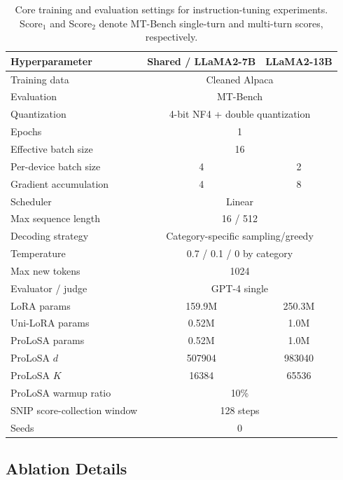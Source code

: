 \begin{table}[t]
\centering
\small
\renewcommand{\arraystretch}{0.9} %
\setlength{\tabcolsep}{4pt}
\begin{tabular}{lcc}
\toprule
Hyperparameter & Shared / LLaMA2-7B & LLaMA2-13B \\
\midrule
Training data & \multicolumn{2}{c}{Cleaned Alpaca} \\
Evaluation & \multicolumn{2}{c}{MT-Bench} \\
Quantization & \multicolumn{2}{c}{4-bit NF4 + double quantization} \\
Epochs & \multicolumn{2}{c}{1} \\
Effective batch size & \multicolumn{2}{c}{16} \\
Per-device batch size & 4 & 2 \\
Gradient accumulation & 4 & 8 \\
Scheduler & \multicolumn{2}{c}{Linear} \\
Max sequence length & \multicolumn{2}{c}{16 / 512} \\
Decoding strategy & \multicolumn{2}{c}{Category-specific sampling/greedy} \\
Temperature & \multicolumn{2}{c}{0.7 / 0.1 / 0 by category} \\
Max new tokens & \multicolumn{2}{c}{1024} \\
Evaluator / judge & \multicolumn{2}{c}{GPT-4 single} \\
LoRA params & 159.9M & 250.3M \\
Uni-LoRA params & 0.52M & 1.0M \\
ProLoSA params & 0.52M & 1.0M \\
ProLoSA $d$ & 507904 & 983040 \\
ProLoSA $K$ & 16384 & 65536 \\
ProLoSA warmup ratio & \multicolumn{2}{c}{10\%} \\
SNIP score-collection window & \multicolumn{2}{c}{128 steps}\\
Seeds & \multicolumn{2}{c}{0} \\
\bottomrule
\end{tabular}
\caption{Core training and evaluation settings for instruction-tuning experiments. Score$_1$ and Score$_2$ denote MT-Bench single-turn and multi-turn scores, respectively.}
\label{tab:instruction_hyperparams}
\end{table}

\subsection{Ablation Details}
\label{app:ablation}


